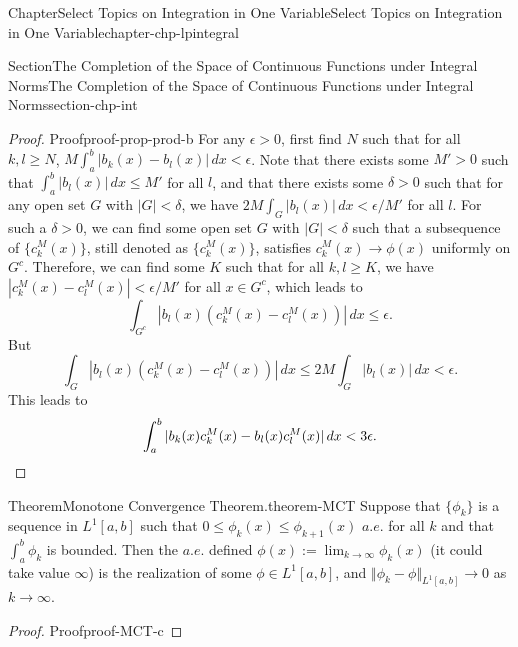 \documentclass[oneside,10pt,]{book}
\numberwithin{equation}{section}
\newcommand{\qedhere}{\relax}
\begin{document}
\begin{chapterptx}{Chapter}{Select Topics on Integration in One Variable}{}{Select Topics on Integration in One Variable}{}{}{chapter-chp-lpintegral}
\begin{sectionptx}{Section}{The Completion of the Space of Continuous Functions under Integral Norms}{}{The Completion of the Space of Continuous Functions under Integral Norms}{}{}{section-chp-int}
\begin{proof}{Proof}{}{proof-prop-prod-b}
For any \(\epsilon > 0\), first find \(N\) such that for all \(k, l\ge N\), \(M \int_{a}^{b}| b_{k}(x)- b_{l}(x)|\, dx < \epsilon\). Note that there exists some \(M' > 0\) such that \(\int_{a}^{b}|b_{l}(x)|\, dx \le M'\) for all \(l\), and that there exists some \(\delta > 0\) such that for any open set \(G\) with \(|G| < \delta\), we have \(2M \int_{G} |b_{l}(x)|\, dx < \epsilon/M'\) for all \(l\). For such a \(\delta > 0\), we can find some open set \(G\) with \(|G| < \delta\) such that a subsequence of \(\{c_{k}^{M}(x) \}\), still denoted as \(\{c_{k}^{M}(x) \}\), satisfies \(c_{k}^{M}(x) \to \phi(x)\) uniformly on \(G^{c}\). Therefore, we can find some \(K\) such that for all \(k, l\ge K\), we have \(| c_{k}^{M}(x)-c_{l}^{M}(x)| < \epsilon/M'\) for all \(x\in G^{c}\), which leads to%
\begin{equation*}
\int_{G^{c}} |b_{l}(x) \left(c_{k}^{M}(x)-c_{l}^{M}(x)\right)|\, dx\le \epsilon.
\end{equation*}
But%
\begin{equation*}
\int_{G} |b_{l}(x) \left(c_{k}^{M}(x)-c_{l}^{M}(x)\right)|\, dx\le 2M \int_{G} |b_{l}(x) |\, dx < \epsilon.
\end{equation*}
This leads to%
\begin{equation*}
\int_{a}^{b}|b_{k}(x)c_{k}^{M}(x)-b_{l}(x)c_{l}^{M}(x)|\, dx  < 3\epsilon\text{.}\qedhere
\end{equation*}
%
\end{proof}
\begin{theorem}{Theorem}{Monotone Convergence Theorem.}{}{theorem-MCT}%
Suppose that \(\{\phi_{k}\}\) is a sequence in \(L^{1}[a, b]\) such that \(0\le \phi_{k}(x)\le \phi_{k+1}(x)\) \(a.e.\) for all \(k\) and that \(\int_{a}^{b} \phi_{k}\) is bounded. Then the \(a.e.\) defined \(\phi (x) :=\lim_{k\to \infty} \phi_{k}(x)\) (it could take value \(\infty\)) is the realization of some \(\phi \in L^{1}[a, b]\), and \(\Vert \phi_{k}-\phi \Vert_{L^{1}[a, b]}\to 0\) as \(k\to \infty\).%
\end{theorem}
\begin{proof}{Proof}{}{proof-MCT-c}

\end{proof}
\end{sectionptx}
\end{chapterptx}
\end{document}
